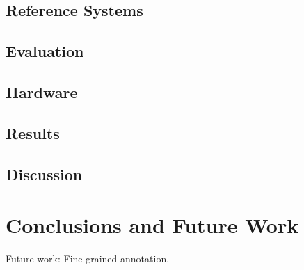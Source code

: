 \documentclass[11pt]{article}
\begin{document}
\subsection{Reference Systems}
\label{sec: reference systems}

\subsection{Evaluation}
\label{sec: evaluation}

\subsection{Hardware}
\label{sec: hardware}

\subsection{Results}
\label{sec: results}

\subsection{Discussion}
\label{sec: discussion}



\section{Conclusions and Future Work}
\label{sec: conclusions}


Future work: Fine-grained annotation.



\newpage

%

\end{document}
